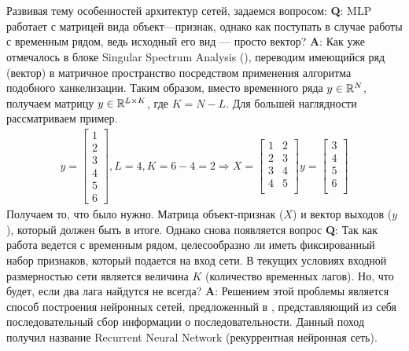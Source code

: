 \\\\
\indent Развивая тему особенностей архитектур сетей, задаемся вопросом: \textbf{Q}: MLP работает с матрицей вида объект---признак, однако как поступать в случае работы с временным рядом, ведь исходный его вид --- просто вектор? \textbf{A}: Как уже отмечалось в блоке Singular Spectrum Analysis (), переводим имеющийся ряд (вектор) в матричное пространство посредством применения алгоритма подобного ханкелизации. Таким образом, вместо временного ряда $y \in \mathbb{R}^{N}$, получаем матрицу $y \in \mathbb{R}^{L \times K}$, где $K  = N - L$. Для большей наглядности рассматриваем пример.
\begin{equation}
	\begin{split}
		y = \left[\begin{matrix}
			1\\2\\3\\4\\5\\6
		\end{matrix}\right], L = 4, K = 6 - 4 = 2 \Rightarrow
		X = \left[\begin{matrix}
			1 & 2\\
			2 & 3\\
			3 & 4\\
			4 & 5\\
		\end{matrix}\right]
		y = \left[\begin{matrix}
			3\\
			4\\
			5\\
			6\\
		\end{matrix}\right]
	\end{split}	
\end{equation}
Получаем то, что было нужно. Матрица объект-признак ($X$) и вектор выходов ($y$), который должен быть в итоге. Однако снова появляется вопрос \textbf{Q}: Так как работа ведется с временным рядом, целесообразно ли иметь фиксированный набор признаков, который подается на вход сети. В текущих условиях входной размерностью сети является величина $K$ (количество временных лагов). Но, что будет, если два лага найдутся не всегда? \textbf{A}: Решением этой проблемы является способ построения нейронных сетей, предложенный в \cite{hochreiter1997long, rumelhart1986learning}, представляющий из себя последовательный сбор информации о последовательности. Данный поход получил название Recurrent Neural Network (рекуррентная нейронная сеть).

